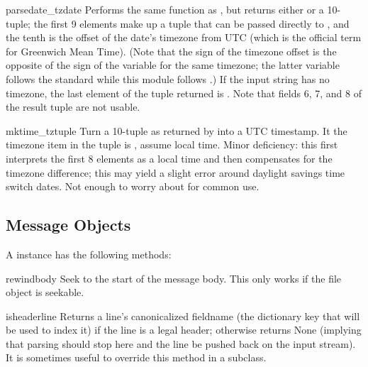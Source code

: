 \begin{funcdesc}{parsedate_tz}{date}
Performs the same function as , but returns
either  or a 10-tuple; the first 9 elements make up a tuple
that can be passed directly to , and the tenth
is the offset of the date's timezone from UTC (which is the official
term for Greenwich Mean Time).  (Note that the sign of the timezone
offset is the opposite of the sign of the 
variable for the same timezone; the latter variable follows the
\POSIX{} standard while this module follows .)  If the input
string has no timezone, the last element of the tuple returned is
.  Note that fields 6, 7, and 8 of the result tuple are not
usable.
\end{funcdesc}

\begin{funcdesc}{mktime_tz}{tuple}
Turn a 10-tuple as returned by  into a UTC
timestamp.  It the timezone item in the tuple is , assume
local time.  Minor deficiency: this first interprets the first 8
elements as a local time and then compensates for the timezone
difference; this may yield a slight error around daylight savings time
switch dates.  Not enough to worry about for common use.
\end{funcdesc}


\begin{seealso}
\end{seealso}


\subsection{Message Objects \label{message-objects}}

A  instance has the following methods:

\begin{methoddesc}{rewindbody}{}
Seek to the start of the message body.  This only works if the file
object is seekable.
\end{methoddesc}

\begin{methoddesc}{isheader}{line}
Returns a line's canonicalized fieldname (the dictionary key that will
be used to index it) if the line is a legal  header; otherwise
returns None (implying that parsing should stop here and the line be
pushed back on the input stream).  It is sometimes useful to override
this method in a subclass.
\end{methoddesc}

